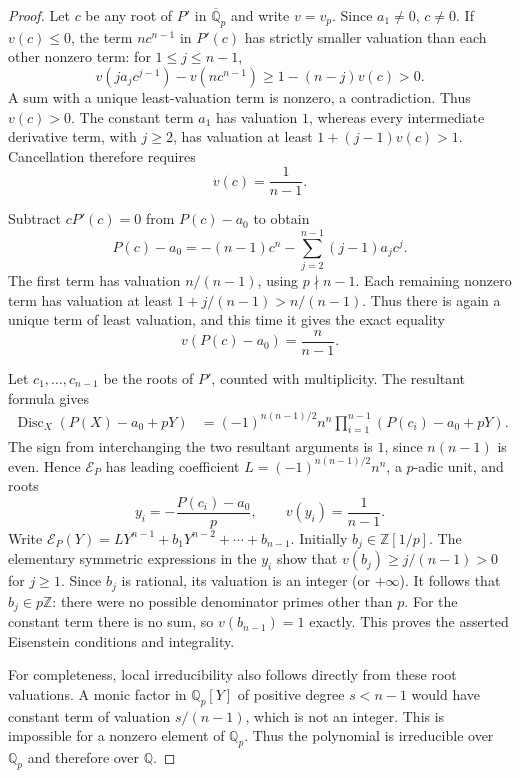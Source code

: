 \documentclass[11pt,a4paper]{article}
\theoremstyle{definition}
\theoremstyle{remark}
\newcommand{\QQ}{\mathbb Q}
\newcommand{\ZZ}{\mathbb Z}
\newcommand{\Disc}{\operatorname{Disc}}
\begin{document}
\begin{proof}
Let $c$ be any root of $P'$ in $\overline{\QQ}_p$ and write $v=v_p$.
Since $a_1\ne0$, $c\ne0$. If $v(c)\le0$, the term $nc^{n-1}$
in $P'(c)$ has strictly smaller valuation than each other nonzero
term: for $1\le j\le n-1$,
\[
 v(ja_jc^{j-1})-v(nc^{n-1})
 \ge 1-(n-j)v(c)>0.
\]
A sum with a unique least-valuation term is nonzero, a contradiction.
Thus $v(c)>0$. The constant term $a_1$ has valuation $1$, whereas
every intermediate derivative term, with $j\ge2$, has valuation
at least $1+(j-1)v(c)>1$. Cancellation therefore requires
\begin{equation}\label{eq:critical-point-v}
 v(c)=\frac1{n-1}.
\end{equation}

Subtract $cP'(c)=0$ from $P(c)-a_0$ to obtain
\begin{equation}\label{eq:critical-value-identity}
 P(c)-a_0=-(n-1)c^n
 -\sum_{j=2}^{n-1}(j-1)a_jc^j.
\end{equation}
The first term has valuation $n/(n-1)$, using $p\nmid n-1$.
Each remaining nonzero term has valuation at least
$1+j/(n-1)>n/(n-1)$. Thus there is again a unique term of least
valuation, and this time it gives the exact equality
\begin{equation}\label{eq:critical-value-v}
 \boxed{v(P(c)-a_0)=\frac n{n-1}.}
\end{equation}

Let $c_1,\ldots,c_{n-1}$ be the roots of $P'$, counted with
multiplicity. The resultant formula gives
\begin{align*}
 \Disc_X(P(X)-a_0+pY)
 &=(-1)^{n(n-1)/2}n^n
   \prod_{i=1}^{n-1}(P(c_i)-a_0+pY).
\end{align*}
The sign from interchanging the two resultant arguments is $1$,
since $n(n-1)$ is even. Hence $\mathcal E_P$ has leading
coefficient $L=(-1)^{n(n-1)/2}n^n$, a $p$-adic unit, and roots
\[
 y_i=-\frac{P(c_i)-a_0}{p},\qquad v(y_i)=\frac1{n-1}.
\]
Write $\mathcal E_P(Y)=LY^{n-1}+b_1Y^{n-2}+\cdots+b_{n-1}$.
Initially $b_j\in\ZZ[1/p]$. The elementary symmetric expressions
in the $y_i$ show that $v(b_j)\ge j/(n-1)>0$ for $j\ge1$.
Since $b_j$ is rational, its valuation is an integer (or $+\infty$).
It follows that $b_j\in p\ZZ$: there were no possible denominator
primes other than $p$. For the constant term there is no sum,
so $v(b_{n-1})=1$ exactly. This proves the asserted Eisenstein
conditions and integrality.

For completeness, local irreducibility also follows directly from
these root valuations. A monic factor in $\QQ_p[Y]$ of positive
degree $s<n-1$ would have constant term of valuation $s/(n-1)$,
which is not an integer. This is impossible for a nonzero element
of $\QQ_p$. Thus the polynomial is irreducible over $\QQ_p$ and
therefore over $\QQ$.
\end{proof}
\end{document}
